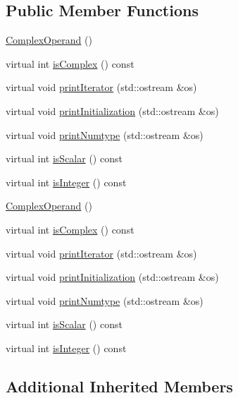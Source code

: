 \subsection*{Public Member Functions}
\begin{DoxyCompactItemize}
\item 
\hyperlink{classComplexOperand_ac9ffacf60ea8b4a80cb09364224c623b}{Complex\+Operand} ()
\item 
virtual int \hyperlink{classComplexOperand_abfb05144e06abe3a596d4fd2495b38b5}{is\+Complex} () const 
\item 
virtual void \hyperlink{classComplexOperand_af8d11d8d7229ad3e6f53b5b9d2661c8e}{print\+Iterator} (std\+::ostream \&os)
\item 
virtual void \hyperlink{classComplexOperand_ae3f78b71b0b659f7e5e6464f5382b17e}{print\+Initialization} (std\+::ostream \&os)
\item 
virtual void \hyperlink{classComplexOperand_ae8159bafdc5570c8d5e5493a6debcbe4}{print\+Numtype} (std\+::ostream \&os)
\item 
virtual int \hyperlink{classComplexOperand_a5acd70b79965c21778b4a31c0877b5b3}{is\+Scalar} () const 
\item 
virtual int \hyperlink{classComplexOperand_a5a13a706ced04e3ec2f71c674fa75d2e}{is\+Integer} () const 
\item 
\hyperlink{classComplexOperand_ac9ffacf60ea8b4a80cb09364224c623b}{Complex\+Operand} ()
\item 
virtual int \hyperlink{classComplexOperand_abfb05144e06abe3a596d4fd2495b38b5}{is\+Complex} () const 
\item 
virtual void \hyperlink{classComplexOperand_af8d11d8d7229ad3e6f53b5b9d2661c8e}{print\+Iterator} (std\+::ostream \&os)
\item 
virtual void \hyperlink{classComplexOperand_ae3f78b71b0b659f7e5e6464f5382b17e}{print\+Initialization} (std\+::ostream \&os)
\item 
virtual void \hyperlink{classComplexOperand_ae8159bafdc5570c8d5e5493a6debcbe4}{print\+Numtype} (std\+::ostream \&os)
\item 
virtual int \hyperlink{classComplexOperand_a5acd70b79965c21778b4a31c0877b5b3}{is\+Scalar} () const 
\item 
virtual int \hyperlink{classComplexOperand_a5a13a706ced04e3ec2f71c674fa75d2e}{is\+Integer} () const 
\end{DoxyCompactItemize}
\subsection*{Additional Inherited Members}


